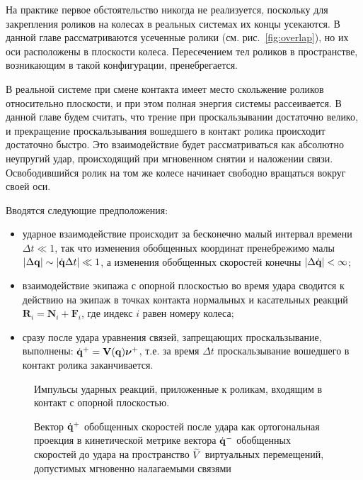 На практике первое обстоятельство никогда не реализуется, поскольку для закрепления роликов на колесах в реальных системах их концы усекаются.
В данной главе рассматриваются усеченные ролики (см. рис.~\ref{fig:overlap}), но их оси расположены в плоскости колеса. Пересечением тел роликов в пространстве, возникающим в такой конфигурации, пренебрегается.

В реальной системе при смене контакта имеет место скольжение роликов относительно плоскости, и при этом полная энергия системы рассеивается. В данной главе будем считать, что трение при проскальзывании достаточно велико, и прекращение проскальзывания вошедшего в контакт ролика происходит достаточно быстро. Это взаимодействие будет рассматриваться как абсолютно неупругий удар, происходящий при мгновенном снятии и наложении связи. Освободившийся ролик на том же колесе начинает свободно вращаться вокруг своей оси.

Вводятся следующие предположения:
\begin{itemize}
    \item ударное взаимодействие происходит за бесконечно малый интервал времени $\Delta t \ll 1$, так что изменения обобщенных координат пренебрежимо малы $|\Delta \mathbf{q}| \sim |\dot{\mathbf{q}}\Delta t| \ll 1$, а изменения обобщенных скоростей конечны $|\Delta \dot{\mathbf{q}}| < \infty$;
    \item взаимодействие экипажа с опорной плоскостью во время удара сводится к действию на экипаж в точках контакта нормальных и касательных реакций $\mathbf{R}_i = \mathbf{N}_i + \mathbf{F}_i$, где индекс $i$ равен номеру колеса;
    \item сразу после удара 
    уравнения связей, запрещающих проскальзывание, выполнены: $\dot{\mathbf{q}}^+ = \mathbf{V}(\mathbf{q})\boldsymbol{\mathbf{\nu}}^+$, т.е. за время $\Delta t$ проскальзывание вошедшего в контакт ролика заканчивается.
\end{itemize}

\begin{center}
    \begin{figure}[ht]
            \centering
            \caption{Импульсы ударных реакций, приложенные к роликам, входящим в контакт с опорной плоскостью.}
            \label{fig:react}
        \endminipage
        \qquad
            \centering
            \caption{Вектор $\dot{\mathbf{q}}^+$ обобщенных скоростей после удара как ортогональная проекция в кинетической метрике вектора $\dot{\mathbf{q}}^-$ обобщенных скоростей до удара на пространство $\widetilde{V}$ виртуальных перемещений, допустимых мгновенно налагаемыми связями}
            \label{fig:project}
        \endminipage
    \end{figure}
\end{center}

